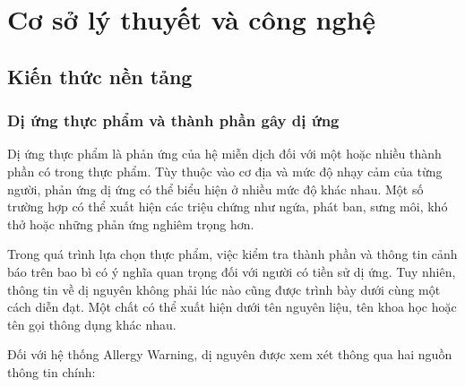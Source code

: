 	
	
	\chapter{Cơ sở lý thuyết và công nghệ}
	\label{ch:cosolythuyet}
	
	
	
	\section{Kiến thức nền tảng}
	
	\subsection{Dị ứng thực phẩm và thành phần gây dị ứng}
	
	Dị ứng thực phẩm là phản ứng của hệ miễn dịch đối với một hoặc nhiều
	thành phần có trong thực phẩm. Tùy thuộc vào cơ địa và mức độ nhạy cảm
	của từng người, phản ứng dị ứng có thể biểu hiện ở nhiều mức độ khác
	nhau. Một số trường hợp có thể xuất hiện các triệu chứng như ngứa,
	phát ban, sưng môi, khó thở hoặc những phản ứng nghiêm trọng hơn.
	
	Trong quá trình lựa chọn thực phẩm, việc kiểm tra thành phần và thông
	tin cảnh báo trên bao bì có ý nghĩa quan trọng đối với người có tiền
	sử dị ứng. Tuy nhiên, thông tin về dị nguyên không phải lúc nào cũng
	được trình bày dưới cùng một cách diễn đạt. Một chất có thể xuất hiện
	dưới tên nguyên liệu, tên khoa học hoặc tên gọi thông dụng khác nhau.
	
	Đối với hệ thống Allergy Warning, dị nguyên được xem xét thông qua
	hai nguồn thông tin chính:
	

